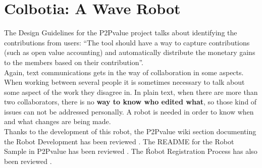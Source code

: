 \thispagestyle{sectioned}
\chapter{Colbotia: A Wave Robot}
\label{subsec:color_intro}
The Design Guidelines for the P2Pvalue project \cite{ref:p2pvalue} talks about identifying the contributions from users: ``The tool should have a way to capture contributions (such as open value accounting) and automatically distribute the monetary gains to the members based on their contribution''.\\[.2cm]
Again, text communications gets in the way of collaboration in some aspects. When working between several people it is sometimes necessary to talk about some aspect of the work they disagree in. In plain text, when there are more than two collaborators, there is no \textbf{way to know who edited what}, so those kind of issues can not be addressed personally. A robot is needed in order to know when and what changes are being made.\\[.2cm]
Thanks to the development of this robot, the P2Pvalue wiki section documenting the Robot Development has been reviewed \cite{ref:robot_development}. The README for the Robot Sample in P2Pvalue has been reviewed \cite{ref:readme_sample}. The Ŕobot Registration Process has also been reviewed \cite{ref:registration_process}.

